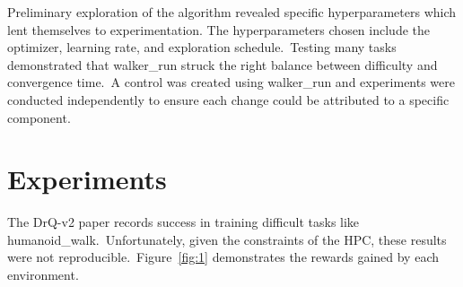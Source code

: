 \documentclass[conference]{./IEEEtran/IEEEtran} %
\begin{document}
    Preliminary exploration of the algorithm revealed specific hyperparameters which lent themselves to experimentation.
    The hyperparameters chosen include the optimizer, learning rate, and exploration schedule.\ Testing many tasks
    demonstrated that walker\_run struck the right balance between difficulty and convergence time.\ A control was
    created using walker\_run and experiments were conducted independently to ensure each change could be attributed
    to a specific component.

    \section{Experiments}\label{sec:experiments}
    The DrQ-v2 paper records success in training difficult tasks like humanoid\_walk.\ Unfortunately, given the constraints of
    the HPC, these results were not reproducible.\ Figure~\ref{fig:1} demonstrates the rewards gained by each environment.
\end{document}
